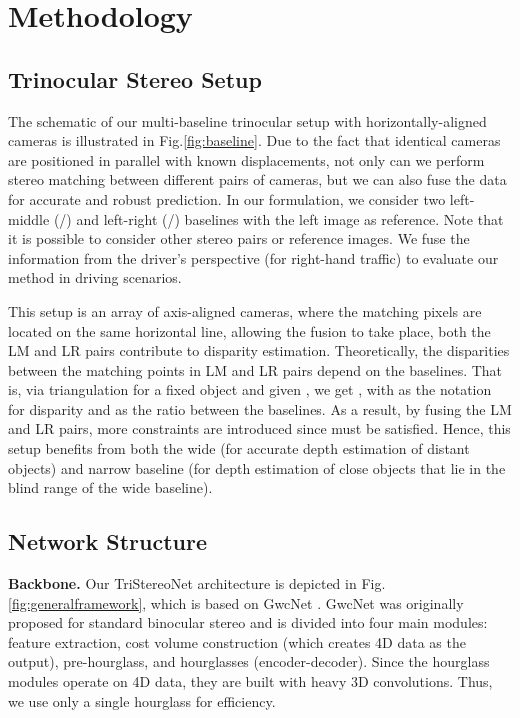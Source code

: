 \documentclass[10pt,twocolumn,letterpaper]{article}
\begin{document}
\section{Methodology}
\label{ProposedMethod}
\subsection{Trinocular Stereo Setup}
The schematic of our multi-baseline trinocular setup with horizontally-aligned cameras is illustrated in Fig.\ref{fig:baseline}. Due to the fact that identical cameras are positioned in parallel with known displacements, not only can we perform stereo matching between different pairs of cameras, but we can also fuse the data for accurate and robust prediction. In our formulation, we consider two left-middle (/) and left-right (/) baselines with the left image as reference. Note that it is possible to consider other stereo pairs or reference images. We fuse the information from the driver's perspective (for right-hand traffic) to evaluate our method in driving scenarios.

This setup is an array of axis-aligned cameras, where the matching pixels are located on the same horizontal line, allowing the fusion to take place, \ie both the LM and LR pairs contribute to disparity estimation. Theoretically, the disparities between the matching points in LM and LR pairs depend on the baselines. That is, via triangulation for a fixed object and given , we get , with  as the notation for disparity and  as the ratio between the baselines. As a result, by fusing the LM and LR pairs, more constraints are introduced since  must be satisfied. Hence, this setup benefits from both the wide (for accurate depth estimation of distant objects) and narrow baseline (for depth estimation of close objects that lie in the blind range of the wide baseline).
\subsection{Network Structure} 
\noindent\textbf{Backbone.} Our TriStereoNet architecture is depicted in Fig. \ref{fig:generalframework}, which is based on GwcNet \cite{guo2019group}. GwcNet was originally proposed for standard binocular stereo and is divided into four main modules: feature extraction, cost volume construction (which creates 4D data as the output), pre-hourglass, and hourglasses (encoder-decoder). Since the hourglass modules operate on 4D data, they are built with heavy 3D convolutions. Thus, we use only a single hourglass for efficiency.
\end{document}
